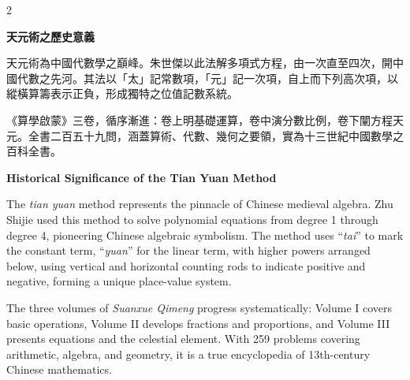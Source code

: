 \documentclass[11pt,a4paper]{article}
\begin{document}
\begin{paracol}{2}
\begin{leftcolumn}
\noindent\textbf{天元術之歷史意義}

天元術為中國代數學之巔峰。朱世傑以此法解多項式方程，由一次直至四次，開中國代數之先河。其法以「太」記常數項，「元」記一次項，自上而下列高次項，以縱橫算籌表示正負，形成獨特之位值記數系統。

《算學啟蒙》三卷，循序漸進：卷上明基礎運算，卷中演分數比例，卷下闡方程天元。全書二百五十九問，涵蓋算術、代數、幾何之要領，實為十三世紀中國數學之百科全書。
\end{leftcolumn}

\switchcolumn

\noindent\textbf{Historical Significance of the Tian Yuan Method}

The \textit{tian yuan} method represents the pinnacle of Chinese medieval algebra. Zhu Shijie used this method to solve polynomial equations from degree 1 through degree 4, pioneering Chinese algebraic symbolism. The method uses ``\textit{tai}'' to mark the constant term, ``\textit{yuan}'' for the linear term, with higher powers arranged below, using vertical and horizontal counting rods to indicate positive and negative, forming a unique place-value system.

The three volumes of \textit{Suanxue Qimeng} progress systematically: Volume I covers basic operations, Volume II develops fractions and proportions, and Volume III presents equations and the celestial element. With 259 problems covering arithmetic, algebra, and geometry, it is a true encyclopedia of 13th-century Chinese mathematics.
\end{paracol}

\vspace{0.5cm}
\end{document}
